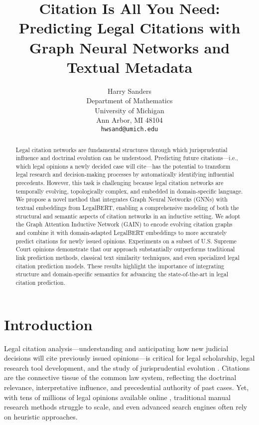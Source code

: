 \documentclass{article}
\title{Citation Is All You Need:\\ Predicting Legal Citations with Graph Neural Networks and Textual Metadata}
\author{%
  Harry Sanders \\
  Department of Mathematics\\
  University of Michigan\\
  Ann Arbor, MI 48104 \\
  \texttt{hwsand@umich.edu} \\
}
\begin{document}
\maketitle


\begin{abstract}
    Legal citation networks are fundamental structures through which jurisprudential influence and doctrinal evolution can be understood. Predicting future citations—i.e., which legal opinions a newly decided case will cite—has the potential to transform legal research and decision-making processes by automatically identifying influential precedents. However, this task is challenging because legal citation networks are temporally evolving, topologically complex, and embedded in domain-specific language. We propose a novel method that integrates Graph Neural Networks (GNNs) with textual embeddings from LegalBERT, enabling a comprehensive modeling of both the structural and semantic aspects of citation networks in an inductive setting. We adopt the Graph Attention Inductive Network (GAIN) to encode evolving citation graphs and combine it with domain-adapted LegalBERT embeddings to more accurately predict citations for newly issued opinions. Experiments on a subset of U.S. Supreme Court opinions demonstrate that our approach substantially outperforms traditional link prediction methods, classical text similarity techniques, and even specialized legal citation prediction models. These results highlight the importance of integrating structure and domain-specific semantics for advancing the state-of-the-art in legal citation prediction.
\end{abstract}
    
\section{Introduction}
Legal citation analysis—understanding and anticipating how new judicial decisions will cite previously issued opinions—is critical for legal scholarship, legal research tool development, and the study of jurisprudential evolution \citep{fowler2007network, post2000fractal}. Citations are the connective tissue of the common law system, reflecting the doctrinal relevance, interpretative influence, and precedential authority of past cases. Yet, with tens of millions of legal opinions available online \citep{hall_judicial_2006}, traditional manual research methods struggle to scale, and even advanced search engines often rely on heuristic approaches.
\end{document}
